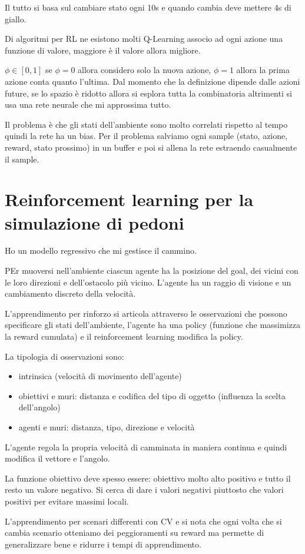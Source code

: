 Il tutto si basa sul cambiare stato ogni 10s e quando cambia deve mettere 4s di 
giallo.

Di algoritmi per RL ne esistono molti Q-Learning associo ad ogni azione 
una funzione di valore, maggiore è il valore allora migliore.

$\phi \in [0,1]$ se $\phi=0$ allora considero solo la nuova azione, $\phi=1$ 
allora la prima azione conta quanto l'ultima. Dal momento che la definizione dipende 
dalle azioni future, se lo spazio è ridotto allora si esplora tutta la combinatoria 
altrimenti si usa una rete neurale che mi approssima tutto.

Il problema è che gli stati dell'ambiente sono molto correlati rispetto al tempo 
quindi la rete ha un bias. Per il problema salviamo ogni sample (stato, azione, 
reward, stato prossimo) in un buffer e poi si allena la rete estraendo casualmente 
il sample.

\section{Reinforcement learning per la simulazione di pedoni}
Ho un modello regressivo che mi gestisce il cammino. 

PEr muoversi nell'ambiente ciascun agente ha la posizione del goal, dei vicini con 
le loro direzioni e dell'ostacolo più vicino. L'agente ha un raggio di visione e un 
cambiamento discreto della velocità.

L'apprendimento per rinforzo si articola attraverso le osservazioni che possono 
specificare gli stati dell'ambiente, l'agente ha una policy (funzione che massimizza 
la reward cumulata) e il reinforcement learning modifica la policy.

La tipologia di osservazioni sono:
\begin{itemize}
      \item intrinsica (velocità di movimento dell'agente)
      \item obiettivi e muri: distanza e codifica del tipo di oggetto (influenza la scelta dell'angolo)
      \item agenti e muri: distanza, tipo, direzione e velocità
\end{itemize}

L'agente regola la propria velocità di camminata in maniera continua e quindi
modifica il vettore e l'angolo.

La funzione obiettivo deve spesso essere: obiettivo molto alto positivo e tutto 
il resto un valore negativo. Si cerca di dare i valori negativi piuttosto che 
valori positivi per evitare massimi locali.

L'apprendimento per scenari differenti con CV e si nota che ogni volta che si cambia 
scenario otteniamo dei peggioramenti su reward ma permette di generalizzare bene 
e ridurre i tempi di apprendimento.